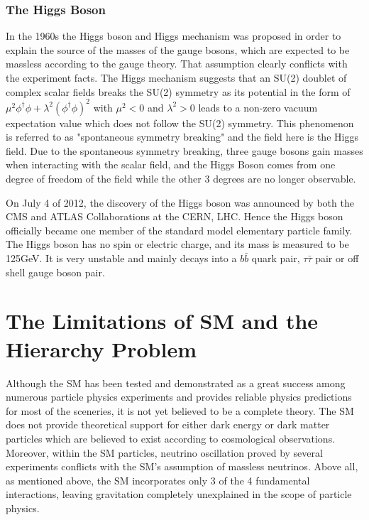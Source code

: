 \subsubsection{The Higgs Boson}
In the 1960s the Higgs boson and Higgs mechanism was proposed in order to explain the source of the masses of the gauge bosons\cite{higgstheory1,higgstheory2,higgstheory3}, which are expected to be massless according to the gauge theory. That assumption clearly conflicts with the experiment facts. The Higgs mechanism suggests that an SU(2) doublet of complex scalar fields breaks the SU(2) symmetry as its potential in the form of $\mu^{2}\phi^{\dagger}\phi + \lambda^{2}(\phi^{\dagger}\phi)^2$ with $\mu^{2}<0$ and $\lambda^{2}>0$ leads to a non-zero vacuum expectation value which does not follow the SU(2) symmetry. This phenomenon is referred to as "spontaneous symmetry breaking" and the field here is the Higgs field. Due to the spontaneous symmetry breaking, three gauge bosons gain masses when interacting with the scalar field, and the Higgs Boson comes from one degree of freedom of the field while the other 3 degrees are no longer observable.

\vspace{0.3cm}
On July 4 of 2012, the discovery of the Higgs boson was announced by both the CMS and ATLAS Collaborations at the CERN, LHC\cite{higgsdiscover1,higgsdiscover2}. Hence the Higgs boson officially became one member of the standard model elementary particle family. The Higgs boson has no spin or electric charge, and its mass is measured to be 125GeV. It is very unstable and mainly decays into a $b\bar{b}$ quark pair, $\tau\bar{\tau}$ pair or off shell gauge boson pair.

\section{The Limitations of SM and the Hierarchy Problem}
Although the SM has been tested and demonstrated as a great success among numerous particle physics experiments and provides reliable physics predictions for most of the sceneries, it is not yet believed to be a complete theory. The SM does not provide theoretical support for either dark energy or dark matter particles which are believed to exist according to cosmological observations. Moreover, within the SM particles, neutrino oscillation proved by several experiments conflicts with the SM's assumption of massless neutrinos. Above all, as mentioned above, the SM incorporates only 3 of the 4 fundamental interactions, leaving gravitation completely unexplained in the scope of particle physics.

